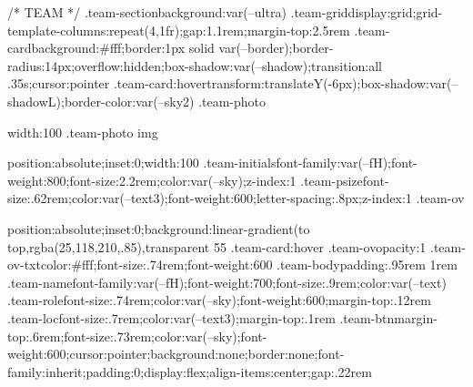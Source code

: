 {{{{{{{{{{{{/* TEAM */
.team-section{background:var(--ultra)}
.team-grid{display:grid;grid-template-columns:repeat(4,1fr);gap:1.1rem;margin-top:2.5rem}
.team-card{background:#fff;border:1px solid var(--border);border-radius:14px;overflow:hidden;box-shadow:var(--shadow);transition:all .35s;cursor:pointer}
.team-card:hover{transform:translateY(-6px);box-shadow:var(--shadowL);border-color:var(--sky2)}
.team-photo{width:100%
.team-photo img{position:absolute;inset:0;width:100%
.team-initials{font-family:var(--fH);font-weight:800;font-size:2.2rem;color:var(--sky);z-index:1}
.team-psize{font-size:.62rem;color:var(--text3);font-weight:600;letter-spacing:.8px;z-index:1}
.team-ov{position:absolute;inset:0;background:linear-gradient(to top,rgba(25,118,210,.85),transparent 55%
.team-card:hover .team-ov{opacity:1}
.team-ov-txt{color:#fff;font-size:.74rem;font-weight:600}
.team-body{padding:.95rem 1rem}
.team-name{font-family:var(--fH);font-weight:700;font-size:.9rem;color:var(--text)}
.team-role{font-size:.74rem;color:var(--sky);font-weight:600;margin-top:.12rem}
.team-loc{font-size:.7rem;color:var(--text3);margin-top:.1rem}
.team-btn{margin-top:.6rem;font-size:.73rem;color:var(--sky);font-weight:600;cursor:pointer;background:none;border:none;font-family:inherit;padding:0;display:flex;align-items:center;gap:.22rem}

}}}}}}}}}}}}}}}
